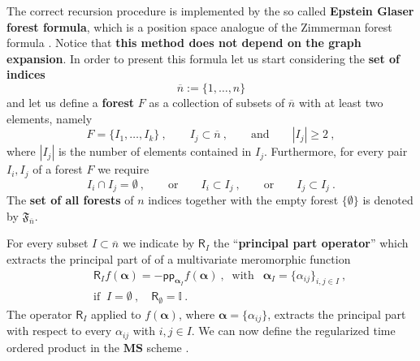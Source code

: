 \documentclass[11pt]{book}
\newcommand{\pp}{\mathsf{pp}}
\newcommand{\MS}{\textbf{MS}}
\newcommand{\alphabd}{\boldsymbol{\alpha}}
\newcommand{\abs}[1]{\left|#1\right|}
\newcommand{\Ibb}{\mathbb{I}}
\newcommand{\Rsf}{\mathsf{R}}
\theoremstyle{break}
\begin{document}
The correct recursion procedure is implemented by the so called \textbf{Epstein Glaser forest formula}, which is a position space analogue of the Zimmerman forest formula \cite{DFKR_2014}. Notice that \textbf{this method does not depend on the graph expansion}. In order to present this formula let us start considering the \textbf{set of indices}
%
\begin{equation*}
\overline{n} := \{1,\dots , n\}
\end{equation*}
%
and let us define a \textbf{forest} $F$ as a collection of subsets of $\overline{n}$ with at least two elements, namely 
%
\begin{equation*}
F = \{ I_1,\dots, I_k\} \ , \qquad I_j \subset \overline{n} \ , \qquad \mbox{and} \qquad \abs{I_j} \geq 2 \ ,
\end{equation*}
%
where $\abs{I_j}$ is the number of elements contained in $I_j$. Furthermore, for every pair $I_i,I_j$ of a forest $F$ we require
%
\begin{equation*}
I_i\cap I_j = \emptyset \ , \qquad \text{or} \qquad I_i \subset I_j \ , \qquad \mbox{or} \qquad  I_j\subset I_j \ .
\end{equation*}
%
The \textbf{set of all forests} of $n$ indices together with the empty forest $\{\emptyset\}$ is denoted by $\mathfrak{F}_{\overline{n}}$.


For every subset $I\subset \overline{n}$ we indicate by $\Rsf_I$ the ``\textbf{principal part operator}'' which extracts the principal part of of a multivariate meromorphic function
%
\begin{eqnarray}
&& \Rsf_I f(\alphabd) = - \pp_{\alphabd_I} f(\alphabd) \ , \ \mbox{ with } \ \ \alphabd_I = \{\alpha_{ij}\}_{i,j \in I} \ , \\
\label{eq:pp_op}
&& \mbox{if } \ I=\emptyset \ , \quad \Rsf_\emptyset = \Ibb \ . \nonumber
\end{eqnarray}
%
The operator $\Rsf_I$ applied to $f(\alphabd)$, where $\alphabd = \{\alpha_{ij}\}$, extracts the principal part with respect to every $\alpha_{ij}$ with $i,j\in I$. We can now define the regularized time ordered product in the $\MS$ scheme \cite{DFKR_2014}.
\end{document}
